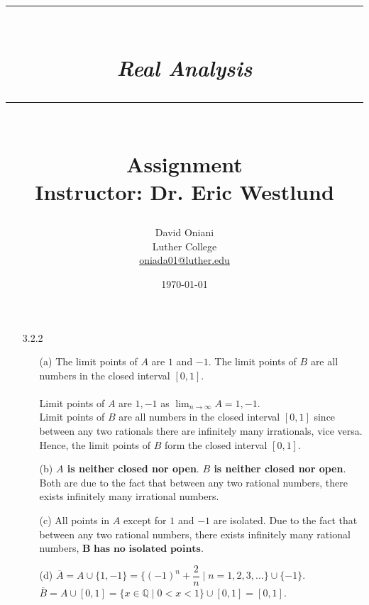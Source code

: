 \documentclass[11pt]{article}
\author{David Oniani\\
        Luther College\\
        \href{mailto:oniada01@luther.edu}{oniada01@luther.edu}}
\title{\rule{\paperwidth - 150pt}{1pt}\textbf{\\\textit{Real Analysis}\\}\rule
{\paperwidth - 150pt}{1pt}\\\textbf{Assignment \textnumero5}\\{\normalsize
Instructor: Dr. Eric Westlund}}
\date{\today}
\newcommand{\rats}{\mathbb{Q}}
\begin{document}
\maketitle

%
%
%

\begin{itemize}
    \item[3.2.2]
        \begin{itemize}
            \item[(a)]
                The limit points of $A$ are $1$ and $-1$. The limit points of
                $B$ are all numbers in the closed interval $[0, 1]$.
                \\
                \\
                Limit points of $A$ are $1, -1$ as
                $\lim_{n \to \infty} A = 1, -1$.
                \\
                Limit points of $B$ are all numbers in the closed interval
                $[0, 1]$ since between any two rationals there are infinitely
                many irrationals, vice versa. Hence, the limit points of $B$
                form the closed interval $[0, 1]$.

            \item[(b)]
                \textbf{$A$ is neither closed nor open}. \textbf{$B$ is neither
                closed nor open}. Both are due to the fact that between any two
                rational numbers, there exists infinitely many irrational
                numbers.

            \item[(c)]
                All points in $A$ except for $1$ and $-1$ are isolated. Due to
                the fact that between any two rational numbers, there exists
                infinitely many rational numbers, $\textbf{B has no isolated
                points}$.

            \item[(d)]
                $\overline{A} = A \cup \{1, -1\} = \Big\{(-1)^n + \dfrac{2}{n}
                \mid n = 1, 2, 3, \dots \Big\} \cup \{-1\}$.\\
                $\overline{B} = A \cup [0, 1] = \{x \in \rats \mid 0 < x < 1\}
                \cup [0, 1] = [0, 1]$.
        \end{itemize}


\end{itemize}
\end{document}
